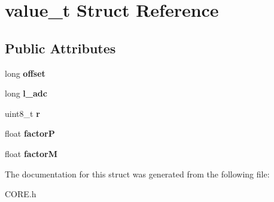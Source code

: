 \hypertarget{structvalue__t}{\section{value\-\_\-t Struct Reference}
\label{structvalue__t}
}
\subsection*{Public Attributes}
\begin{DoxyCompactItemize}
\item 
\hypertarget{structvalue__t_a25f0f66622ec0d30b02bd32fb0ae0358}{long {\bfseries offset}}\label{structvalue__t_a25f0f66622ec0d30b02bd32fb0ae0358}

\item 
\hypertarget{structvalue__t_a4e97ccc0a424f30a9c42847fec0ec03a}{long {\bfseries l\-\_\-adc}}\label{structvalue__t_a4e97ccc0a424f30a9c42847fec0ec03a}

\item 
\hypertarget{structvalue__t_a24677bd8cfa58c17f7b5272086a2881a}{uint8\-\_\-t {\bfseries r}}\label{structvalue__t_a24677bd8cfa58c17f7b5272086a2881a}

\item 
\hypertarget{structvalue__t_a3c840092a574a548b5c0889ac439ecd1}{float {\bfseries factor\-P}}\label{structvalue__t_a3c840092a574a548b5c0889ac439ecd1}

\item 
\hypertarget{structvalue__t_adb5ec8ac2918358cdd2b2c39869fd5ff}{float {\bfseries factor\-M}}\label{structvalue__t_adb5ec8ac2918358cdd2b2c39869fd5ff}

\end{DoxyCompactItemize}


The documentation for this struct was generated from the following file\-:\begin{DoxyCompactItemize}
\item 
C\-O\-R\-E.\-h\end{DoxyCompactItemize}
